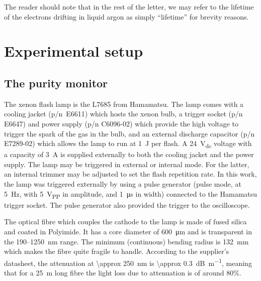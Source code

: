 \documentclass[a4paper,11pt]{article}
\begin{document}
The reader should note that in the rest of the letter, we may refer to the lifetime of the electrons drifting in liquid argon as simply ``lifetime'' for brevity reasons. 

\section{Experimental setup}
\subsection{The purity monitor}
The xenon flash lamp is the L7685 from Hamamatsu. The lamp comes with a cooling jacket (p/n~E6611) which hosts the xenon bulb, a trigger socket (p/n E6647) and power supply (p/n C6096-02) which provide the high voltage to trigger the spark of the gas in the bulb, and an external discharge capacitor (p/n E7289-02) which allows the lamp to run at \SI{1}{\joule} per flash. A \SI{24}{V_{dc}} voltage with a capacity of \SI{3}{A} is supplied externally to both the cooling jacket and the power supply. The lamp may be triggered in external or internal mode. For the latter, an internal trimmer may be adjusted to set the flash repetition rate. In this work, the lamp was triggered externally by using a pulse generator (pulse mode, at \SI{5}{Hz}, with \SI{5}{V_{PP}} in amplitude, and \SI{1}{\micro s} in width) connected to the Hamamatsu trigger socket. The pulse generator also provided the trigger to the oscilloscope. 

The optical fibre which couples the cathode to the lamp is made of fused silica and coated in Polyimide. It has a core diameter of \SI{600}{\micro m} and is transparent in the 190--\SI{1250}{nm} range. The minimum (continuous) bending radius is \SI{132}{mm} which makes the fibre quite fragile to handle. According to the supplier's datasheet, the attenuation at \SI{\approx 250}{nm} is \SI{\approx 0.3}{dB\per\metre}, meaning that for a \SI{25}{m} long fibre the light loss due to attenuation is of around 80\%. 
\end{document}
